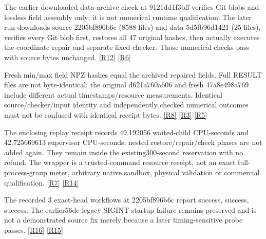 \documentclass[10pt,letterpaper]{article}
\begin{document}
The earlier downloaded data-archive check at 9121dd1f3bff verifies Git blobs and lossless field assembly only; it is not numerical runtime qualification. The later run downloads source 2205bf896b6c (8588 files) and data 5d5fb96d1421 (25 files), verifies every Git blob first, restores all 47 original hashes, then actually executes the coordinate repair and separate fixed checker. Those numerical checks pass with source bytes unchanged. \href{https://github.com/MontrealAI/AGI-Alpha-Invention-Flywheel-Lab/blob/54f229bb0672201dd635a46f8edd71083f1e7bfe/evidence/overnight-008/nasa-data-publication/REPORT.json}{[R12]} \href{https://github.com/MontrealAI/AGI-Alpha-Invention-Flywheel-Lab/blob/54f229bb0672201dd635a46f8edd71083f1e7bfe/evidence/overnight-008/nasa-public-2205/REPORT.json}{[R6]}\par
Fresh min/max field NPZ hashes equal the archived repaired fields. Full RESULT files are not byte-identical: the original d621a760a606 and fresh 47a8e498a769 include different actual timestamps/resource measurements. Identical source/checker/input identity and independently checked numerical outcomes must not be confused with identical receipt bytes. \href{https://github.com/MontrealAI/AGI-Alpha-Invention-Flywheel-Lab/blob/54f229bb0672201dd635a46f8edd71083f1e7bfe/evidence/overnight-008/nasa-public-2205/FIELD_REPRODUCTION.json}{[R8]} \href{https://github.com/MontrealAI/AGI-Alpha-Invention-Flywheel-Lab/blob/54f229bb0672201dd635a46f8edd71083f1e7bfe/research/nasa008/coordinate-r2/bound/artifacts/RESULT.json}{[R3]} \href{https://github.com/MontrealAI/AGI-Alpha-Invention-Flywheel-Lab/blob/54f229bb0672201dd635a46f8edd71083f1e7bfe/evidence/overnight-008/nasa-public-2205/repaired/RESULT.json}{[R5]}\par
The enclosing replay receipt records 49.192056 waited-child CPU-seconds and 42.725669613 supervisor CPU-seconds; nested restore/repair/check phases are not added again. They remain inside the existing300-second reservation with no refund. The wrapper is a trusted-command resource receipt, not an exact full-process-group meter, arbitrary native sandbox, physical validation or commercial qualification. \href{https://github.com/MontrealAI/AGI-Alpha-Invention-Flywheel-Lab/blob/54f229bb0672201dd635a46f8edd71083f1e7bfe/evidence/overnight-008/nasa-public-2205/RECEIPT.json}{[R7]} \href{https://github.com/MontrealAI/AGI-Alpha-Invention-Flywheel-Lab/blob/54f229bb0672201dd635a46f8edd71083f1e7bfe/campaign/overnight-008/economics/recovery/FINAL_COST_SNAPSHOT_EVENT28.json}{[R14]}\par
The recorded 3 exact-head workflows at 2205bf896b6c report success, success, success. The earlier56dc legacy SIGINT startup failure remains preserved and is not a demonstrated source fix merely because a later timing-sensitive probe passes. \href{https://github.com/MontrealAI/AGI-Alpha-Invention-Flywheel-Lab/blob/54f229bb0672201dd635a46f8edd71083f1e7bfe/docs/overnight008-late/CI_2205.json}{[R16]} \href{https://github.com/MontrealAI/AGI-Alpha-Invention-Flywheel-Lab/blob/54f229bb0672201dd635a46f8edd71083f1e7bfe/evidence/overnight-008/legacy-ci-failure-56dc/FAILURE.json}{[R15]}\par
\newpage
\end{document}
